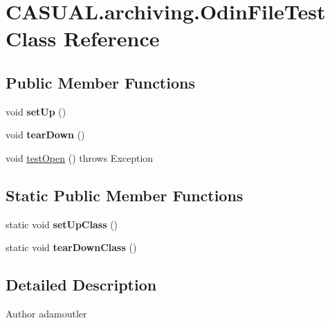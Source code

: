 \hypertarget{classCASUAL_1_1archiving_1_1OdinFileTest}{\section{C\-A\-S\-U\-A\-L.\-archiving.\-Odin\-File\-Test Class Reference}
\label{classCASUAL_1_1archiving_1_1OdinFileTest}
}
\subsection*{Public Member Functions}
\begin{DoxyCompactItemize}
\item 
\hypertarget{classCASUAL_1_1archiving_1_1OdinFileTest_a334d704de50ba1014977e0b4a3112665}{void {\bfseries set\-Up} ()}\label{classCASUAL_1_1archiving_1_1OdinFileTest_a334d704de50ba1014977e0b4a3112665}

\item 
\hypertarget{classCASUAL_1_1archiving_1_1OdinFileTest_a1fbededbb0dc328c74d57c6665df2be4}{void {\bfseries tear\-Down} ()}\label{classCASUAL_1_1archiving_1_1OdinFileTest_a1fbededbb0dc328c74d57c6665df2be4}

\item 
void \hyperlink{classCASUAL_1_1archiving_1_1OdinFileTest_a65ccebb5135d4a731c4db6b1fa30e2b7}{test\-Open} ()  throws Exception 
\end{DoxyCompactItemize}
\subsection*{Static Public Member Functions}
\begin{DoxyCompactItemize}
\item 
\hypertarget{classCASUAL_1_1archiving_1_1OdinFileTest_a4f348dec88c1ed7c45682b6c1c878243}{static void {\bfseries set\-Up\-Class} ()}\label{classCASUAL_1_1archiving_1_1OdinFileTest_a4f348dec88c1ed7c45682b6c1c878243}

\item 
\hypertarget{classCASUAL_1_1archiving_1_1OdinFileTest_a495a53b6e728e43afaf45612c0ece1cd}{static void {\bfseries tear\-Down\-Class} ()}\label{classCASUAL_1_1archiving_1_1OdinFileTest_a495a53b6e728e43afaf45612c0ece1cd}

\end{DoxyCompactItemize}


\subsection{Detailed Description}
\begin{DoxyAuthor}{Author}
adamoutler 
\end{DoxyAuthor}


